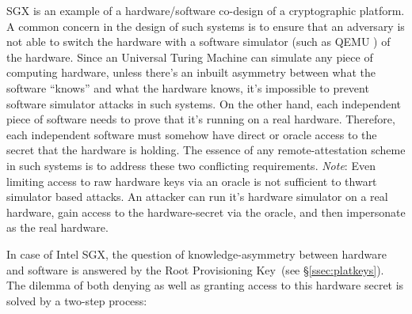 \documentclass[letterpaper]{article}
\newcommand{\secref}[1]{\S\ref{#1}}
\newcommand{\rpk}{\textsf{Root Provisioning Key}}
\begin{document}
  SGX is an example of a hardware/software co-design of a
  cryptographic platform. A common concern in the design of such
  systems is to ensure that an adversary is not able to switch the
  hardware with a software simulator (such as QEMU \cite{qemu,
    opensgx}) of the hardware. Since an Universal Turing Machine can
  simulate any piece of computing hardware, unless there's an inbuilt
  asymmetry between what the software ``knows'' and what the hardware
  knows, it's impossible to prevent software simulator attacks in such
  systems. On the other hand, each independent piece of software needs
  to prove that it's running on a real hardware. Therefore, each
  independent software must somehow have direct or oracle access to
  the secret that the hardware is holding. The essence of any
  remote-attestation scheme in such systems is to address these two
  conflicting requirements. {\em Note}: Even limiting access to raw
  hardware keys via an oracle is not sufficient to thwart simulator
  based attacks. An attacker can run it's hardware simulator on a real
  hardware, gain access to the hardware-secret via the oracle, and
  then impersonate as the real hardware.

  In case of Intel SGX, the question of knowledge-asymmetry between
  hardware and software is answered by the \rpk\ (see
  \secref{ssec:platkeys}). The dilemma of both denying as well as
  granting access to this hardware secret is solved by a two-step
  process:
\end{document}
